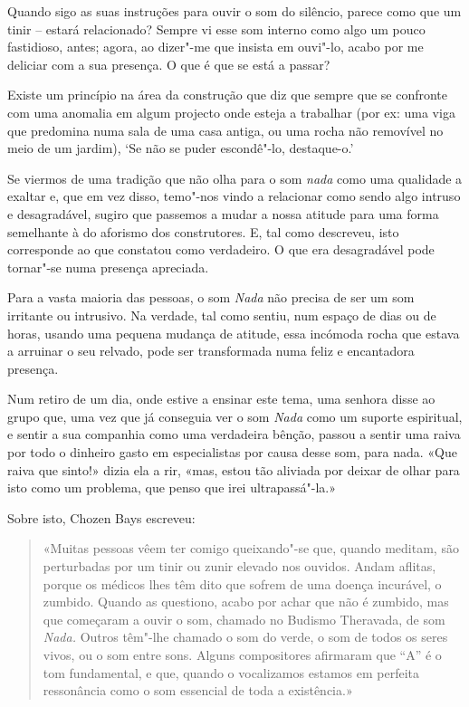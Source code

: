 \smallskip

 Quando sigo as suas instruções para ouvir o som do silêncio, parece
como que um tinir -- estará relacionado? Sempre vi esse som interno como
algo um pouco fastidioso, antes; agora, ao dizer"-me que insista em
ouvi"-lo, acabo por me deliciar com a sua presença. O que é que se está a
passar?

 Existe um princípio na área da construção que diz que sempre que se
confronte com uma anomalia em algum projecto onde esteja a trabalhar
(por ex: uma viga que predomina numa sala de uma casa antiga, ou uma
rocha não removível no meio de um jardim), `Se não se puder escondê"-lo,
destaque-o.'

Se viermos de uma tradição que não olha para o som \emph{nada} como uma
qualidade a exaltar e, que em vez disso, temo"-nos vindo a relacionar
como sendo algo intruso e desagradável, sugiro que passemos a mudar a
nossa atitude para uma forma semelhante à do aforismo dos construtores.
E, tal como descreveu, isto corresponde ao que constatou como
verdadeiro. O que era desagradável pode tornar"-se numa presença
apreciada.

Para a vasta maioria das pessoas, o som \emph{Nada} não precisa de ser
um som irritante ou intrusivo. Na verdade, tal como sentiu, num espaço
de dias ou de horas, usando uma pequena mudança de atitude, essa
incómoda rocha que estava a arruinar o seu relvado, pode ser
transformada numa feliz e encantadora presença.

Num retiro de um dia, onde estive a ensinar este tema, uma senhora disse
ao grupo que, uma vez que já conseguia ver o som \emph{Nada} como um
suporte espiritual, e sentir a sua companhia como uma verdadeira bênção,
passou a sentir uma raiva por todo o dinheiro gasto em especialistas por
causa desse som, para nada. «Que raiva que sinto!» dizia ela a rir,
«mas, estou tão aliviada por deixar de olhar para isto como um problema,
que penso que irei ultrapassá"-la.»

Sobre isto, Chozen Bays escreveu:

\begin{quotation}
«Muitas pessoas vêem ter comigo queixando"-se que, quando meditam, são
perturbadas por um tinir ou zunir elevado nos ouvidos. Andam aflitas,
porque os médicos lhes têm dito que sofrem de uma doença incurável, o
zumbido. Quando as questiono, acabo por achar que não é zumbido, mas que
começaram a ouvir o som, chamado no Budismo Theravada, de som
\emph{Nada.} Outros têm"-lhe chamado o som do verde, o som de todos os
seres vivos, ou o som entre sons. Alguns compositores afirmaram que
``A'' é o tom fundamental, e que, quando o vocalizamos estamos em
perfeita ressonância como o som essencial de toda a existência.»\cite{deep}
\end{quotation}


